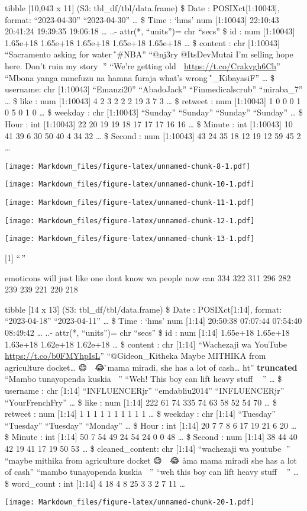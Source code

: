 \documentclass[
]{article}
\begin{document}
tibble {[}10,043 x 11{]} (S3: tbl\_df/tbl/data.frame) \$ Date :
POSIXct{[}1:10043{]}, format: ``2023-04-30'' ``2023-04-30'' \ldots{} \$
Time : `hms' num {[}1:10043{]} 22:10:43 20:41:24 19:39:35 19:06:18
\ldots{} ..- attr(*, ``units'')= chr ``secs'' \$ id : num {[}1:10043{]}
1.65e+18 1.65e+18 1.65e+18 1.65e+18 1.65e+18 \ldots{} \$ content : chr
{[}1:10043{]} ``Sacramento asking for water 🤣\r\n\r\n\#NBA'' ``@nj3ry
@ItsDevMutai I'm selling hope here. Don't ruin my story 🤣'' ``We're
getting old 🤣 \url{https://t.co/Crakvgh6Ch}'' ``Mbona yanga mmefuzu na
hamna furaja what's wrong 🤣\r\n\r\n@Hon\_KibayasiF'' \ldots{} \$
username: chr {[}1:10043{]} ``Emanzi20'' ``AbadoJack''
``Finmedicalscrub'' ``miraba\_7'' \ldots{} \$ like : num {[}1:10043{]} 4
2 3 2 2 2 19 3 7 3 \ldots{} \$ retweet : num {[}1:10043{]} 1 0 0 0 1 0 5
0 1 0 \ldots{} \$ weekday : chr {[}1:10043{]} ``Sunday'' ``Sunday''
``Sunday'' ``Sunday'' \ldots{} \$ Hour : int {[}1:10043{]} 22 20 19 19
18 17 17 17 16 16 \ldots{} \$ Minute : int {[}1:10043{]} 10 41 39 6 30
50 40 4 34 32 \ldots{} \$ Second : num {[}1:10043{]} 43 24 35 18 12 19
12 59 45 2 \ldots{}

\texttt{[image: Markdown\_files/figure-latex/unnamed-chunk-8-1.pdf]}

\texttt{[image: Markdown\_files/figure-latex/unnamed-chunk-10-1.pdf]}

\texttt{[image: Markdown\_files/figure-latex/unnamed-chunk-11-1.pdf]}

\texttt{[image: Markdown\_files/figure-latex/unnamed-chunk-12-1.pdf]}

\texttt{[image: Markdown\_files/figure-latex/unnamed-chunk-13-1.pdf]}

{[}1{]} ``\,''

emoticons will just like one dont know wa people now can 334 322 311 296
282 239 239 221 220 218

tibble {[}14 x 13{]} (S3: tbl\_df/tbl/data.frame) \$ Date :
POSIXct{[}1:14{]}, format: ``2023-04-18'' ``2023-04-11'' \ldots{} \$
Time : `hms' num {[}1:14{]} 20:50:38 07:07:44 07:54:40 08:49:42 \ldots{}
..- attr(*, ``units'')= chr ``secs'' \$ id : num {[}1:14{]} 1.65e+18
1.65e+18 1.63e+18 1.62e+18 1.62e+18 \ldots{} \$ content : chr {[}1:14{]}
``Wachezaji wa YouTube 🤣 \url{https://t.co/b0FMYhpIsL}''
``@Gideon\_Kitheka Maybe MITHIKA from agriculture docket\ldots{} 😄 🤣
😂 \r\nAma mama miradi, she has a lot of cash\ldots{} ht''\textbar{}
\textbf{truncated} ``Mambo tunayopenda kuskia 🤣🌚'' ``Weh! This boy can
lift heavy stuff 🤣🙌🏾'' \ldots{} \$ username : chr {[}1:14{]}
``INFLUENCERjr'' ``emdabliu2014'' ``INFLUENCERjr'' ``YourFrenchFry''
\ldots{} \$ like : num {[}1:14{]} 222 61 74 335 74 63 58 52 54 70
\ldots{} \$ retweet : num {[}1:14{]} 1 1 1 1 1 1 1 1 1 1 \ldots{} \$
weekday : chr {[}1:14{]} ``Tuesday'' ``Tuesday'' ``Tuesday'' ``Monday''
\ldots{} \$ Hour : int {[}1:14{]} 20 7 7 8 6 17 19 21 6 20 \ldots{} \$
Minute : int {[}1:14{]} 50 7 54 49 24 54 24 0 0 48 \ldots{} \$ Second :
num {[}1:14{]} 38 44 40 42 19 41 17 19 50 53 \ldots{} \$
cleaned\_content: chr {[}1:14{]} ``wachezaji wa youtube 🤣'' ``maybe
mithika from agriculture docket 😄 🤣 😂 \r ama mama miradi she has a
lot of cash'' ``mambo tunayopenda kuskia 🤣🌚'' ``weh this boy can lift
heavy stuff 🤣🙌🏾'' \ldots{} \$ word\_count : int {[}1:14{]} 4 18 4 8 25
3 3 2 7 11 \ldots{}

\texttt{[image: Markdown\_files/figure-latex/unnamed-chunk-20-1.pdf]}
\end{document}
